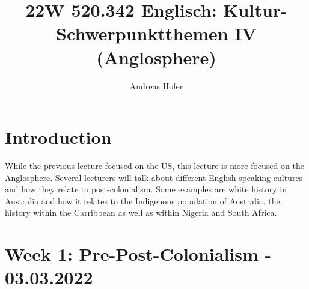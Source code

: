 \documentclass{article}
\title{22W 520.342 Englisch: Kultur-Schwerpunktthemen IV (Anglosphere)}
\author{Andreas Hofer}
\begin{document}
	\large
	\section*{Introduction}
	While the previous lecture focused on the US, this lecture is more focused on the Anglosphere. Several lecturers will talk about different English speaking cultures and how they relate to post-colonialism. Some examples are white history in Australia and how it relates to the Indigenous population of Australia, the history within the Carribbean as well as within Nigeria and South Africa. \\

	\section{Week 1: Pre-Post-Colonialism - 03.03.2022}
\end{document}
